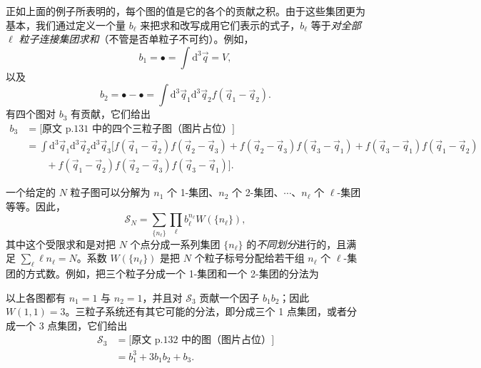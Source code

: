 正如上面的例子所表明的，每个图的值是它的各个的贡献之积。由于这些集团更为基本，我们通过定义一个量 $b_\ell$ 来把求和改写成用它们表示的式子，$b_\ell$ 等于\emph{对全部 $\ell$ 粒子连接集团求和}（不管是否单粒子不可约）。例如，
\begin{equation}\label{eq:5.19}
b_1=\bullet=\int\mathrm{d}^3\vec q=V,
\end{equation}
以及
\begin{equation}\label{eq:5.20}
b_2=\bullet\!-\!\bullet=\int\mathrm{d}^3\vec q_1\mathrm{d}^3\vec q_2f(\vec q_1-\vec q_2).
\end{equation}
有四个图对 $b_3$ 有贡献，它们给出
\begin{equation}\label{eq:5.21}
\begin{aligned}
b_3&=\Big[\text{原文 p.131 中的四个三粒子图（图片占位）}\Big]\\
&=\int\mathrm{d}^3\vec q_1\mathrm{d}^3\vec q_2\mathrm{d}^3\vec q_3\Big[f(\vec q_1-\vec q_2)f(\vec q_2-\vec q_3)+f(\vec q_2-\vec q_3)f(\vec q_3-\vec q_1)+f(\vec q_3-\vec q_1)f(\vec q_1-\vec q_2)\\
&\qquad+f(\vec q_1-\vec q_2)f(\vec q_2-\vec q_3)f(\vec q_3-\vec q_1)\Big].
\end{aligned}
\end{equation}


一个给定的 $N$ 粒子图可以分解为 $n_1$ 个 1-集团、$n_2$ 个 2-集团、$\cdots$、$n_\ell$ 个 $\ell$-集团等等。因此，
\begin{equation}\label{eq:5.22}
\mathscr S_N=\sum_{\{n_\ell\}}\prod_\ell b_\ell^{n_\ell}W(\{n_\ell\}),
\end{equation}
其中这个受限求和是对把 $N$ 个点分成一系列集团 $\{n_\ell\}$ 的\emph{不同划分}进行的，且满足 $\sum_\ell \ell n_\ell=N$。系数 $W(\{n_\ell\})$ 是把 $N$ 个粒子标号分配给若干组 $n_\ell$ 个 $\ell$-集团的方式数。例如，把三个粒子分成一个 1-集团和一个 2-集团的分法为

\begin{center}
\end{center}

以上各图都有 $n_1=1$ 与 $n_2=1$，并且对 $\mathscr S_3$ 贡献一个因子 $b_1b_2$；因此 $W(1,1)=3$。三粒子系统还有其它可能的分法，即分成三个 1 点集团，或者分成一个 3 点集团，它们给出
\begin{equation*}
\begin{aligned}
\mathscr S_3&=\Big[\text{原文 p.132 中的图（图片占位）}\Big]\\
&=b_1^3+3b_1b_2+b_3.
\end{aligned}
\end{equation*}

